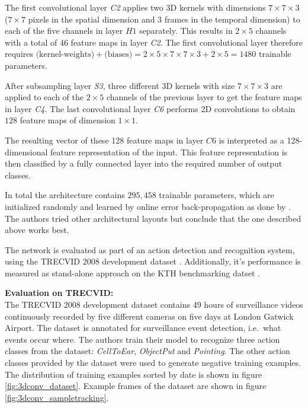 The first convolutional layer \textit{C2} applies two 3D kernels with dimensions $7\times7\times3$ ($7\times7$ pixels in the spatial dimension and $3$ frames in the temporal dimension) to each of the five channels in layer $H1$ separately. 
This results in $2\times5$ channels with a total of 46 feature maps in layer \textit{C2}.
The first convolutional layer therefore requires $\text{(kernel-weights)} + \text{(biases)} = 2 \times 5 \times 7 \times 7 \times 3 + 2 \times 5 = 1480$ trainable parameters. 

After subsampling layer \textit{S3}, three different 3D kernels with size $7 \times 7 \times 3$ are applied to each of the $2 \times 5$ channels of the previous layer to get the feature maps in layer \textit{C4}.
The last convolutional layer \textit{C6} performs 2D convolutions to obtain $128$ feature maps of dimension $1 \times 1$.

The resulting vector of these 128 feature maps in layer $C6$ is interpreted as a 128-dimensional feature representation of the input.
This feature representation is then classified by a fully connected layer into the required number of output classes.

In total the architecture contains $295,458$ trainable parameters, which are initialized randomly and learned by online error back-propagation as done by \textcite{lecun_gradient-based_1998-1}.
The authors tried other architectural layouts but conclude that the one described above works best.

The network is evaluated as part of an action detection and recognition system, using the TRECVID 2008 development dataset \cite{rose_trecvid_2009}.
Additionally, it's performance is measured as stand-alone approach on the KTH benchmarking datset \cite{schuldt_recognizing_2004}.

\textbf{Evaluation on TRECVID:} \\
The TRECVID 2008 development dataset \cite{rose_trecvid_2009} contains 49 hours of surveillance videos continuously recorded by five different cameras on five days at London Gatwick Airport.
The dataset is annotated for surveillance event detection, i.e.\ what events occur where.
The authors train their model to recognize three action classes from the dataset: \textit{CellToEar}, \textit{ObjectPut} and \textit{Pointing}.
The other action classes provided by the dataset were used to generate negative training examples.
The distribution of training examples sorted by date is shown in figure \ref{fig:3dconv_dataset}.
Example frames of the dataset are shown in figure \ref{fig:3dconv_sampletracking}.

